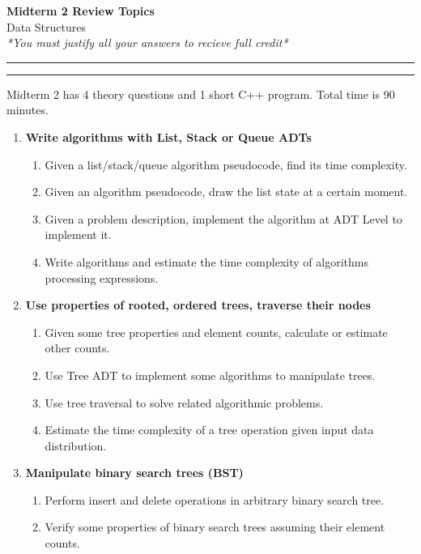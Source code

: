 \documentclass[a4paper,12pt]{article}
\begin{document}
\begin{center}
{\bf\Huge Midterm 2 Review Topics} \\[5pt]
Data Structures \\
\textit{*You must justify all your answers to recieve full credit*}
\end{center}

\hrule
\vspace{2pt}
\hrule
\vspace{12pt}

Midterm 2 has 4 theory questions and 1 short C++ program.
Total time is 90 minutes. 

{\small
\begin{enumerate}
\item \textbf{Write algorithms with List, Stack or Queue ADTs}
\begin{enumerate}[label=1.\Alph*.]
\item Given a list/stack/queue algorithm pseudocode, find its time complexity.
\item Given an algorithm pseudocode, draw the list state at a certain moment.
\item Given a problem description, implement the algorithm at ADT Level to implement it.
\item Write algorithms and estimate the time complexity of algorithms processing expressions.
\end{enumerate}
\item \textbf{Use properties of rooted, ordered trees, traverse their nodes} 
\begin{enumerate}[label=2.\Alph*.]
\item Given some tree properties and element counts, calculate or estimate other counts.
\item Use Tree ADT to implement some algorithms to manipulate trees.
\item Use tree traversal to solve related algorithmic problems.
\item Estimate the time complexity of a tree operation given input data distribution.
\end{enumerate}
\item \textbf{Manipulate binary search trees (BST)} 
\begin{enumerate}[label=3.\Alph*.]
\item Perform insert and delete operations in arbitrary binary search tree. 
\item Verify some properties of binary search trees assuming their element counts.

\end{enumerate}
\end{enumerate}}
\end{document}
